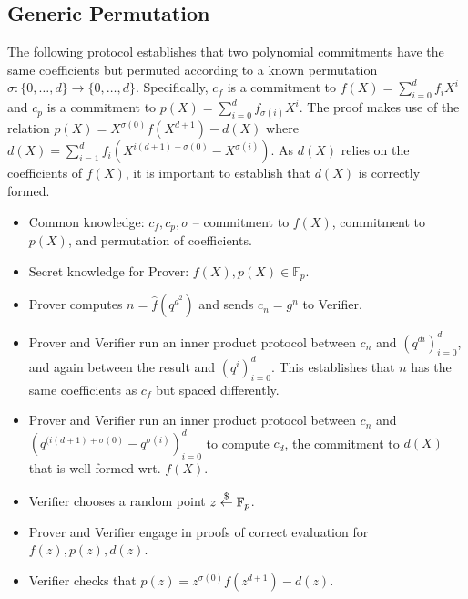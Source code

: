 \documentclass{article}
\theoremstyle{definition}
\begin{document}
\subsection{Generic Permutation}

The following protocol establishes that two polynomial commitments have the same coefficients but permuted according to a known permutation $\sigma : \{0,\ldots,d\} \rightarrow \{0,\ldots,d\}$. Specifically, $c_f$ is a commitment to $f(X) = \sum_{i=0}^d f_i X^i$ and $c_p$ is a commitment to $p(X) = \sum_{i=0}^d f_{\sigma(i)} X^i$. The proof makes use of the relation $p(X) = X^{\sigma(0)} f(X^{d+1}) - d(X)$ where $d(X) = \sum_{i=1}^d f_i (X^{i(d+1) + \sigma(0)} - X^{\sigma(i)})$. As $d(X)$ relies on the coefficients of $f(X)$, it is important to establish that $d(X)$ is correctly formed.

\begin{itemize}
    \item Common knowledge: $c_f, c_p, \sigma$ -- commitment to $f(X)$, commitment to $p(X)$, and permutation of coefficients.
    \item Secret knowledge for Prover: $f(X), p(X) \in \mathbb{F}_p$.
    \item Prover computes $n = \hat{f}(q^{d^2})$ and sends $c_n = g^n$ to Verifier.
    \item Prover and Verifier run an inner product protocol between $c_n$ and $(q^{di})_{i=0}^d$, and again between the result and $(q^i)_{i=0}^d$. This establishes that $n$ has the same coefficients as $c_f$ but spaced differently.
    \item Prover and Verifier run an inner product protocol between $c_n$ and $(q^{(i(d+1) + \sigma(0)} - q^{\sigma(i)})_{i=0}^d$ to compute $c_d$, the commitment to $d(X)$ that is well-formed wrt. $f(X)$.
    \item Verifier chooses a random point $z \overset{\$}{\gets} \mathbb{F}_p$.
    \item Prover and Verifier engage in proofs of correct evaluation for $f(z), p(z), d(z)$.
    \item Verifier checks that $p(z) = z^{\sigma(0)} f(z^{d+1}) - d(z)$.
\end{itemize}


 
\end{document}
